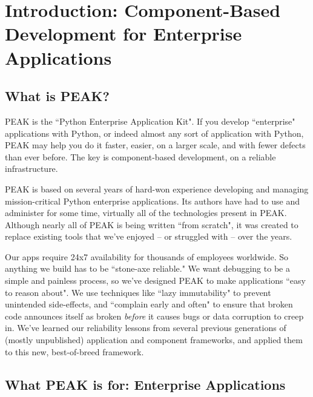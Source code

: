 \chapter{Introduction: Component-Based Development for Enterprise Applications}

\section{What is PEAK?}

PEAK is the ``Python Enterprise Application Kit". If you develop
``enterprise" applications with Python, or indeed almost any sort of
application with Python, PEAK may help you do it faster, easier, on a
larger scale, and with fewer defects than ever before. The key is
component-based development, on a reliable infrastructure. 

PEAK is based on several years of hard-won experience developing and
managing mission-critical Python enterprise applications. Its authors
have had to use and administer for some time, virtually all of the
technologies present in PEAK. Although nearly all of PEAK is being
written ``from scratch", it was created to replace existing tools that
we've enjoyed -- or struggled with -- over the years. 

Our apps require 24x7 availability for thousands of employees worldwide.
So anything we build has to be ``stone-axe reliable." We want debugging
to be a simple and painless process, so we've designed PEAK to make
applications ``easy to reason about". We use techniques like ``lazy
immutability" to prevent unintended side-effects, and ``complain early
and often" to ensure that broken code announces itself as broken
\emph{before} it causes bugs or data corruption to creep in.  We've learned
our reliability lessons from several previous generations of (mostly
unpublished) application and component frameworks, and applied them to
this new, best-of-breed framework. 














\section{What PEAK is for: Enterprise Applications} 

